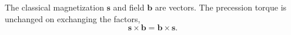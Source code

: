 \documentclass{article}
\begin{document}
The classical magnetization $\mathbf{s}$ and field $\mathbf{b}$ are vectors.
The precession torque is unchanged on exchanging the factors,
\begin{equation}
\mathbf{s}\times\mathbf{b} = \mathbf{b}\times\mathbf{s} .
\label{eq:cross-exchange}
\end{equation}
\end{document}

